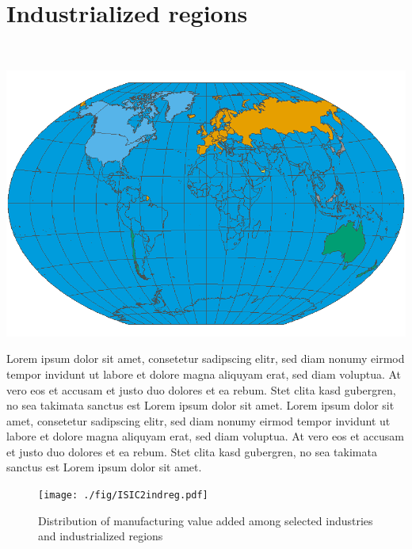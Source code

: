 \documentclass[
  openany, nofonts]{tufte-book}
\begin{document}
\hypertarget{industrialized-regions}{%
\section{Industrialized regions}\label{industrialized-regions}}

~

\begin{marginfigure}
\includegraphics[width=1\linewidth]{./img/GROUP_INDREGwintri.png} \end{marginfigure}

Lorem ipsum dolor sit amet, consetetur sadipscing elitr, sed diam nonumy eirmod tempor invidunt ut labore et dolore magna aliquyam erat, sed diam voluptua. At vero eos et accusam et justo duo dolores et ea rebum. Stet clita kasd gubergren, no sea takimata sanctus est Lorem ipsum dolor sit amet. Lorem ipsum dolor sit amet, consetetur sadipscing elitr, sed diam nonumy eirmod tempor invidunt ut labore et dolore magna aliquyam erat, sed diam voluptua. At vero eos et accusam et justo duo dolores et ea rebum. Stet clita kasd gubergren, no sea takimata sanctus est Lorem ipsum dolor sit amet.

\vspace*{\fill}

\begin{figure}
\texttt{[image: ./fig/ISIC2indreg.pdf]} \caption[Distribution of manufacturing value added among selected industries and industrialized regions]{Distribution of manufacturing value added among selected industries and industrialized regions}\label{fig:c05-indshareIND}
\end{figure}

\clearpage\pagebreak
\end{document}
